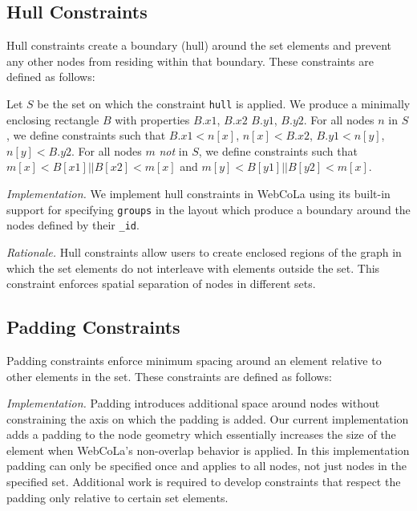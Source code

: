\subsection{Hull Constraints}

Hull constraints create a boundary (hull) around the set elements and prevent any other nodes from residing within that boundary. These 
constraints are defined as follows:

\begin{definition}
Let $S$ be the set on which the constraint \texttt{hull} is applied. We produce a minimally enclosing rectangle $B$ with properties $B.x1$, $B.x2$ $B.y1$, $B.y2$. For all nodes
$n$ in $S$, we define constraints such that $B.x1 < n[x]$, $n[x] < B.x2$,
$B.y1 < n[y]$, $n[y] < B.y2$. For all nodes $m$ \emph{not} in $S$, we define
constraints such that $m[x] < B[x1] || B[x2] < m[x]$ and $m[y] < B[y1] || B[y2] < m[x]$.
\end{definition}

\emph{Implementation.}
We implement hull constraints in WebCoLa using its built-in support for 
specifying \texttt{groups} in the layout which produce a boundary around 
the nodes defined by their \texttt{\_id}.

\emph{Rationale.}
Hull constraints allow users to create enclosed regions of the graph in
which the set elements do not interleave with elements outside the set. This
constraint enforces spatial separation of nodes in different sets.


\subsection{Padding Constraints}

Padding constraints enforce minimum spacing around an element relative
to other elements in the set. These constraints are defined as follows:


\emph{Implementation.}
Padding introduces additional space around nodes without constraining the
axis on which the padding is added. Our current implementation adds a
padding to the node geometry which essentially increases the size of the element
when WebCoLa's non-overlap behavior is applied. In this implementation
padding can only be specified once and applies to all nodes, not just nodes
in the specified set. Additional work is required to develop constraints that
respect the padding only relative to certain set elements.

